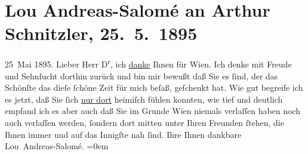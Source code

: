 

         
         \renewcommand{\erwaehntePersonen}{Personen: Lou Andreas-Salomé}
         \renewcommand{\erwaehnteOrte}{Orte: Paris, Wien}
         \renewcommand{\erwaehnteWerke}{}
               \section[Lou Andreas-Salomé an Arthur Schnitzler, 25. 5. 1895]{ Lou Andreas-Salomé an Arthur Schnitzler, 25. 5. 1895}\nopagebreak{}\rehead{ }\begin{ledgroupsized}[t]{13cm}\normalsize\beginnumbering \toendnotes[C]{\smallbreak\pagebreak[2]} 
\pstart
           {\pb}25 Mai 1895.\pend
           \pstart{}Lieber Herr D\textsuperscript{r},\pend\pstart
           ich \uline{danke} Ihnen für Wien. Ich denke mit Freude und Sehnſucht dorthin zurück und bin mir bewußt
               daß Sie es ſind, der das Schönſte das dieſe ſchöne Zeit für mich beſaß, geſchenkt
               hat. Wie gut begreife ich es jetzt, daß Sie ſich \uline{nur
                  dort} heimiſch fühlen konnten, wie tief und deutlich empfand ich es aber auch
               daß Sie im Grunde Wien niemals verlaſſen haben
               noch auch verlaſſen werden, ſondern dort mitten {\pb}unter Ihren Freunden ſtehen, die Ihnen immer und auf das Innigſte nah ſind.\pend
           \pstart
           Ihre Ihnen dankbare{\\[\baselineskip]}\spacefill\mbox{Lou Andreas-Salomé.}\pend
           \leftskip=0em{}
         
         \endnumbering{}\end{ledgroupsized}  \newcommand{\dateiname}{L00445}\newcommand{\titel}{Lou Andreas-Salomé an Arthur Schnitzler, 25. 5. 1895}\newcommand{\editorInnen}{Martin Anton Müller und Gerd-Hermann Susen}
      